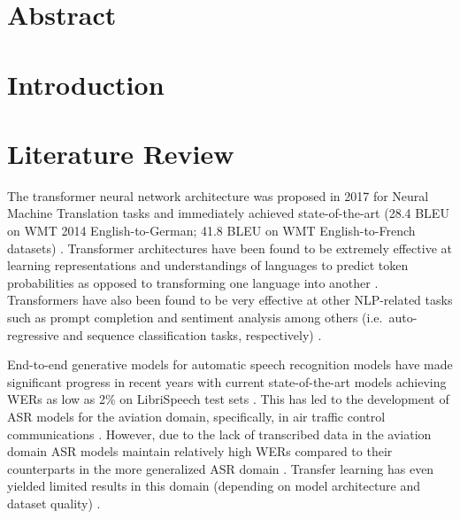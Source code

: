 \documentclass[12pt]{article}
\begin{document}
\section{Abstract}
\section{Introduction}
\section{Literature Review}
The transformer neural network architecture was proposed in 2017 for Neural Machine Translation tasks and immediately achieved
state-of-the-art (28.4 BLEU on WMT 2014 English-to-German; 41.8 BLEU on WMT English-to-French datasets)
\cite{vaswani_attention_2017}. Transformer architectures have been found to be extremely effective at learning representations
and understandings of languages to predict token probabilities as opposed to transforming one language into another
\cite{devlin_bert_2019,liu_roberta_2019}. Transformers have also been found to be very effective at
other NLP-related tasks such as prompt completion and sentiment analysis among others (i.e.~auto-regressive and sequence
classification tasks, respectively) \cite{lewis_bart_2019,radford_improving_2018}.


End-to-end generative models for automatic speech recognition models have made significant progress in recent years with
current state-of-the-art models achieving WERs as low as 2\% on LibriSpeech test sets
\cite{han_contextnet_2020,kriman_quartznet_2020,baevski_wav2vec_2020,li_jasper_2019}. This has led to the development of ASR
models for the aviation domain, specifically, in air traffic control communications
\cite{badrinath_automatic_2022,smidl_air_2019,zuluaga-gomez_automatic_2020,srinivasamurthy_semi-supervised_2017}.
However, due to the lack of transcribed data in the aviation domain
\cite{zuluaga-gomez_automatic_2020,srinivasamurthy_semi-supervised_2017,badrinath_automatic_2022,smidl_air_2019}
ASR models maintain relatively high WERs compared to their counterparts in the more generalized ASR domain
\cite{zuluaga-gomez_automatic_2020,badrinath_automatic_2022}. Transfer learning has even yielded limited results
in this domain (depending on model architecture and dataset quality)
\cite{badrinath_automatic_2022,zuluaga-gomez_automatic_2020}.
\end{document}
